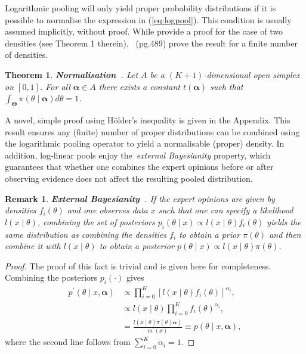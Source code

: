 \documentclass[a4paper, notitlepage, 10pt]{article}
\newtheorem{theo}{Theorem}[]
\newtheorem{remark}{Remark}[]
\begin{document}
Logarithmic pooling will only yield proper probability distributions if it is possible to normalise the expression in (\ref{eq:logpool}).
This condition is usually assumed implicitly, without proof.
While \citet{poole2000} provide a proof for the case of two densities (see Theorem 1 therein),~\cite{genest1986A} (pg.489) prove the result for a finite number of densities.
\begin{theo}
\label{thm:normalisation}
\textbf{Normalisation~\citep{genest1986A}}. 
Let $A$ be a $(K+1)$-dimensional open simplex on $[0,1]$.
For all $\boldsymbol\alpha \in A$ there exists a constant $t(\boldsymbol\alpha)$ such that $\int_{\boldsymbol\Theta}\pi(\theta \mid \boldsymbol \alpha)d\theta = 1$.
\end{theo}
A novel, simple proof using H\"{o}lder's inequality is given in the Appendix.
This result ensures any (finite) number of proper distributions can be combined using the logarithmic pooling operator to yield a normalisable (proper) density.
In addition, log-linear pools enjoy the~\textit{external Bayesianity} property, which guarantees that whether one combines the expert opinions before or after observing evidence does not affect the resulting pooled distribution.
\begin{remark}
 \textbf{External Bayesianity~\citep{genest1984}}. If the expert opinions are given by densities $f_i(\theta)$ and one observes data $x$ such that one can specify a likelihood $l(x \mid \theta)$, combining the set of posteriors $p_i(\theta \mid x) \propto  l(x \mid \theta)f_i(\theta) $ yields the same distribution as combining the densities $f_i$ to obtain a prior $\pi(\theta)$ and then combine it with $l(x \mid \theta)$ to obtain a posterior $p(\theta \mid x) \propto l(x \mid \theta)\pi(\theta)$.
\end{remark}
\begin{proof}
 The proof of this fact is trivial and is given here for completeness.
 Combining the posteriors $p_i(\cdot)$ gives
 \begin{align*}
  p^\prime (\theta \mid x, \boldsymbol \alpha) &\propto \prod_{i = 0}^K \left[  l(x \mid \theta)f_i(\theta) \right]^{\alpha_i},\\
  &\propto   l(x \mid \theta) \prod_{i = 0}^K f_i(\theta)^{\alpha_i},\\
  &=  \frac{l(x \mid \theta)\pi(\theta \mid \boldsymbol \alpha)}{m^{\prime}(x)} \equiv   p(\theta \mid x, \boldsymbol \alpha),
 \end{align*}
 where the second line follows from $\sum_{i=0}^K \alpha_i = 1$.
\end{proof}
\end{document}
